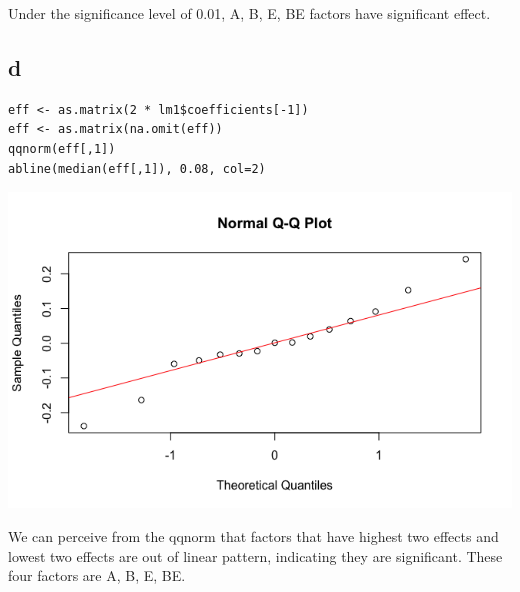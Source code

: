 \documentclass[11pt,letterpaper]{article}
\begin{document}
\noindent Under the significance level of 0.01, A, B, E, BE factors have significant effect. 

\subsection*{d}
\begin{verbatim}
eff <- as.matrix(2 * lm1$coefficients[-1])
eff <- as.matrix(na.omit(eff))
qqnorm(eff[,1])
abline(median(eff[,1]), 0.08, col=2)
\end{verbatim}

\includegraphics[scale=0.55]{lect20-3-d.png}

\noindent We can perceive from the qqnorm that factors that have highest two effects and lowest two effects are out of linear pattern, indicating they are significant. These four factors are A, B, E, BE.
\end{document}
